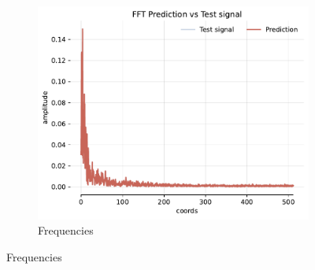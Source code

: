 \begin{figure}[h]
\begin{subfigure}[b]{0.32\textwidth}
        \centering
        \includegraphics[width=\textwidth]{img/ch4/fft-noise-hf4096-w512.pdf}
        \caption{Frequencies}
    \end{subfigure}


\end{figure}

